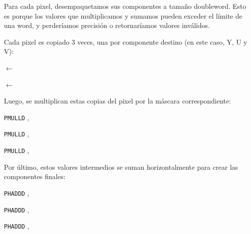 \begin{center}
	 

	 

	 
\end{center}

Para cada pixel, desempaquetamos sus componentes a tamaño doubleword. Esto es porque los valores que multiplicamos y sumamos pueden exceder el límite de una word, y perderíamos precisión o retornaríamos valores inválidos.

Cada pixel es copiado 3 veces, una por componente destino (en este caso, Y, U y V):

\begin{center}

	 

	 $\leftarrow$ 

	 $\leftarrow$ 

\end{center}

Luego, se multiplican estas copias del pixel por la máscara correspondiente:

\begin{center}

	\texttt{PMULLD} ,  \hfill

	 

	\texttt{PMULLD} ,  \hfill

	 

	\texttt{PMULLD} ,  \hfill

	 
	
\end{center}

Por último, estos valores intermedios se suman horizontalmente para crear las componentes finales:

\begin{center}

	\texttt{PHADDD} ,  \hfill

	 

	\texttt{PHADDD} ,  \hfill

	 

	\texttt{PHADDD} ,  \hfill

	 

\end{center}

